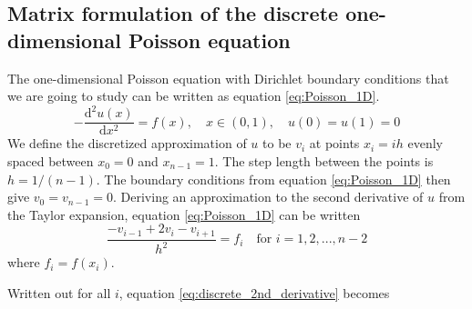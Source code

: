 \documentclass[reprint, english,notitlepage]{revtex4-1}  %
\begin{document}
\subsection{Matrix formulation of the discrete one-dimensional Poisson equation}
The one-dimensional Poisson equation with Dirichlet boundary conditions that we are going to study can be written as equation \ref{eq:Poisson_1D}.
\begin{equation}
  \label{eq:Poisson_1D}
  - \frac{\mathrm d^2 u(x)}{\mathrm d x^2} = f(x), \quad x \in (0, 1), \quad u(0) = u(1) = 0
\end{equation}
We define the discretized approximation of $u$ to be $v_i$ at points $x_i = i h$ evenly spaced between $x_0 = 0$ and $x_{n - 1} = 1$. The step length between the points is $h = 1/(n - 1)$. The boundary conditions from equation \ref{eq:Poisson_1D} then give $v_0 = v_{n - 1} = 0$. Deriving an approximation to the second derivative of $u$ from the Taylor expansion, equation \ref{eq:Poisson_1D} can be written
\begin{equation}
  \label{eq:discrete_2nd_derivative}
  \frac{-v_{i-1} + 2 v_i - v_{i+1}}{h^2} = f_i \quad \text{for } i = 1, 2, ..., n-2
\end{equation}
where $f_i = f(x_i)$.

Written out for all $i$, equation \ref{eq:discrete_2nd_derivative} becomes
\end{document}
